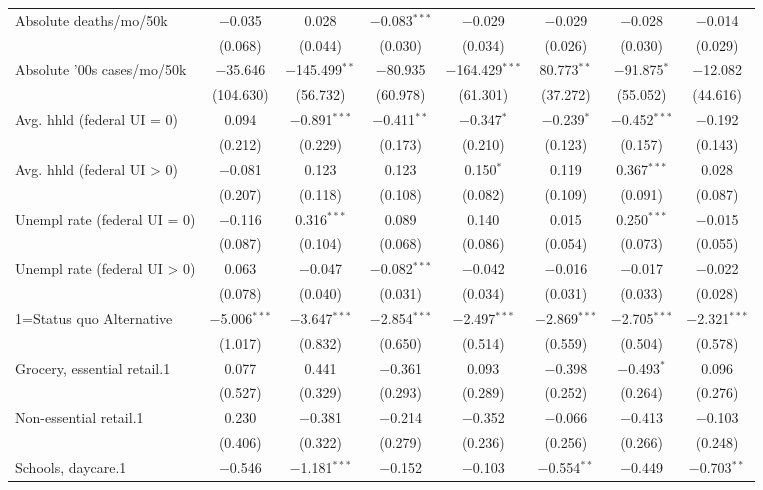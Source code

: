 \begin{table}[!htbp]
\begin{tabular}{@{\extracolsep{5pt}}lccccccc}
 Absolute deaths/mo/50k & $-$0.035 & 0.028 & $-$0.083$^{***}$ & $-$0.029 & $-$0.029 & $-$0.028 & $-$0.014 \\ 
  & (0.068) & (0.044) & (0.030) & (0.034) & (0.026) & (0.030) & (0.029) \\ 
  Absolute '00s cases/mo/50k & $-$35.646 & $-$145.499$^{**}$ & $-$80.935 & $-$164.429$^{***}$ & 80.773$^{**}$ & $-$91.875$^{*}$ & $-$12.082 \\ 
  & (104.630) & (56.732) & (60.978) & (61.301) & (37.272) & (55.052) & (44.616) \\ 
  Avg. hhld  (federal UI = 0) & 0.094 & $-$0.891$^{***}$ & $-$0.411$^{**}$ & $-$0.347$^{*}$ & $-$0.239$^{*}$ & $-$0.452$^{***}$ & $-$0.192 \\ 
  & (0.212) & (0.229) & (0.173) & (0.210) & (0.123) & (0.157) & (0.143) \\ 
  Avg. hhld  (federal UI > 0) & $-$0.081 & 0.123 & 0.123 & 0.150$^{*}$ & 0.119 & 0.367$^{***}$ & 0.028 \\ 
  & (0.207) & (0.118) & (0.108) & (0.082) & (0.109) & (0.091) & (0.087) \\ 
  Unempl rate (federal UI = 0) & $-$0.116 & 0.316$^{***}$ & 0.089 & 0.140 & 0.015 & 0.250$^{***}$ & $-$0.015 \\ 
  & (0.087) & (0.104) & (0.068) & (0.086) & (0.054) & (0.073) & (0.055) \\ 
  Unempl rate (federal UI > 0) & 0.063 & $-$0.047 & $-$0.082$^{***}$ & $-$0.042 & $-$0.016 & $-$0.017 & $-$0.022 \\ 
  & (0.078) & (0.040) & (0.031) & (0.034) & (0.031) & (0.033) & (0.028) \\ 
  1=Status quo Alternative & $-$5.006$^{***}$ & $-$3.647$^{***}$ & $-$2.854$^{***}$ & $-$2.497$^{***}$ & $-$2.869$^{***}$ & $-$2.705$^{***}$ & $-$2.321$^{***}$ \\ 
  & (1.017) & (0.832) & (0.650) & (0.514) & (0.559) & (0.504) & (0.578) \\ 
  Grocery, essential retail.1 & 0.077 & 0.441 & $-$0.361 & 0.093 & $-$0.398 & $-$0.493$^{*}$ & 0.096 \\ 
  & (0.527) & (0.329) & (0.293) & (0.289) & (0.252) & (0.264) & (0.276) \\ 
  Non-essential retail.1 & 0.230 & $-$0.381 & $-$0.214 & $-$0.352 & $-$0.066 & $-$0.413 & $-$0.103 \\ 
  & (0.406) & (0.322) & (0.279) & (0.236) & (0.256) & (0.266) & (0.248) \\ 
  Schools, daycare.1 & $-$0.546 & $-$1.181$^{***}$ & $-$0.152 & $-$0.103 & $-$0.554$^{**}$ & $-$0.449 & $-$0.703$^{**}$ \\ 

\end{tabular}
\end{table}
